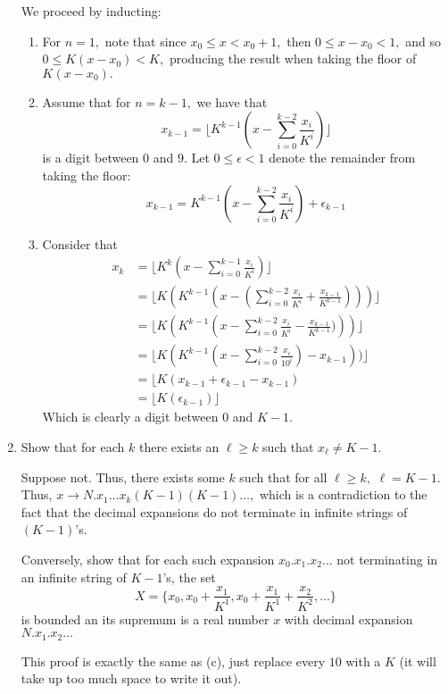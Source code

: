 \documentclass[11pt]{article}
\begin{document}
\begin{enumerate}
\begin{problem}
\end{problem}
\begin{solution}
    We proceed by inducting:
    \begin{enumerate}
            \item For $n=1,$ note that since $x_0 \leq x < x_0+1,$ then $0\leq x - x_0 < 1,$ and so $0\leq K(x-x_0) < K,$ producing the result when taking the floor of $K(x-x_0).$
            \item Assume that for $n = k-1,$ we have that 
            \[x_{k-1} = \lfloor K^{k-1}\left(x - \sum_{i=0}^{k-2}\frac{x_i}{K^i}\right)\rfloor\] is a digit between $0$ and $9.$ Let $0\leq \epsilon<1$ denote the remainder from taking the floor:
            \[x_{k-1} = K^{k-1}\left(x - \sum_{i=0}^{k-2}\frac{x_i}{K^i}\right)+\epsilon_{k-1}\]
            \item Consider that
            \begin{align*}
                x_k &= \lfloor K^{k}\left(x - \sum_{i=0}^{k-1}\frac{x_i}{K^i}\right)\rfloor\\
                &= \lfloor K(K^{k-1}\left(x - (\sum_{i=0}^{k-2}\frac{x_i}{K^i} + \frac{x_{k-1}}{K^{k-1}})\right))\rfloor\\
                &= \lfloor K(K^{k-1}\left(x - \sum_{i=0}^{k-2}\frac{x_i}{K^i} - \frac{x_{k-1}}{K^{k-1}})\right))\rfloor\\
                &= \lfloor K(K^{k-1}\left(x - \sum_{i=0}^{k-2}\frac{x_i}{10^i}\right) - x_{k-1}))\rfloor\\
                &= \lfloor K(x_{k-1} +\epsilon_{k-1} - x_{k-1})\\
                &= \lfloor K(\epsilon_{k-1})\rfloor
            \end{align*}
            Which is clearly a digit between $0$ and $K-1.$
        \end{enumerate}
    \end{solution}
    \item 
    \begin{problem}
        Show that for each $k$ there exists an $\ell\geq k$ such that $x_\ell \neq K-1.$
    \end{problem}
    \begin{solution}
        Suppose not. Thus, there exists some $k$ such that for all $\ell\geq k,$ $\ell = K-1.$ Thus, $x \to N.x_1\dots x_k (K-1)(K-1)\dots,$ which is a contradiction to the fact that the decimal expansions do not terminate in infinite strings of $(K-1)$'s.
    \end{solution}
    \begin{problem}
    Conversely, show that for each such expansion $x_0.x_1.x_2\dots$ not terminating in an infinite string of $K-1$'s, the set
    \[X = \{x_0, x_0 + \frac{x_1}{K^1}, x_0 + \frac{x_1}{K^1} + \frac{x_2}{K^2}, \dots\}\] is bounded an its supremum is a real number $x$ with decimal expansion $N.x_1.x_2\dots$
\end{problem}
\begin{solution}
This proof is exactly the same as (c), just replace every $10$ with a $K$ (it will take up too much space to write it out).
\end{solution}


\end{enumerate}
\end{document}
